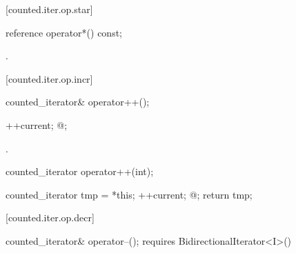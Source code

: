 \begin{addedblock}
[counted.iter.op.star]{}

%
%
\begin{itemdecl}
reference operator*() const;
\end{itemdecl}

\begin{itemdescr}
\pnum
\returns {}.
\end{itemdescr}

[counted.iter.op.incr]{}

%
%
\begin{itemdecl}
counted_iterator& operator++();
\end{itemdecl}

\begin{itemdescr}
\pnum
\requires {}

\pnum
\effects
\begin{codeblock}
++current;
@\dcr@cnt;
\end{codeblock}

\pnum
\returns {}.
\end{itemdescr}

%
%
\begin{itemdecl}
counted_iterator operator++(int);
\end{itemdecl}

\begin{itemdescr}
\pnum
\requires {}

\pnum
\effects
\begin{codeblock}
counted_iterator tmp = *this;
++current;
@\dcr@cnt;
return tmp;
\end{codeblock}
\end{itemdescr}

[counted.iter.op.decr]{}

%
%
\begin{itemdecl}
  counted_iterator& operator--();
    requires BidirectionalIterator<I>()
\end{itemdecl}


\end{addedblock}

